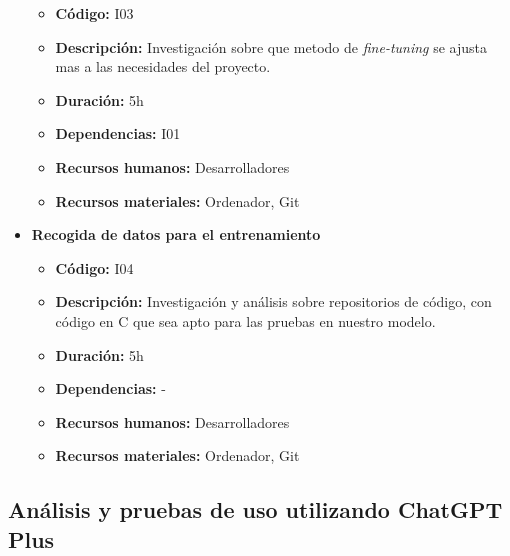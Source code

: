 \begin{itemize}
\begin{itemize}
            \item \textbf{Código:} I03
            \item \textbf{Descripción:} Investigación sobre que metodo de \textit{fine-tuning} se ajusta mas a las necesidades del proyecto.
            \item \textbf{Duración:} 5h
            \item \textbf{Dependencias:} I01
            \item \textbf{Recursos humanos:} Desarrolladores
            \item \textbf{Recursos materiales:} Ordenador, Git
        \end{itemize}
    \item \textbf{Recogida de datos para el entrenamiento}
        \begin{itemize}
            \item \textbf{Código:} I04
            \item \textbf{Descripción:} Investigación y análisis sobre repositorios de código, con código en C que sea apto para las pruebas en nuestro modelo. 
            \item \textbf{Duración:} 5h
            \item \textbf{Dependencias:} -
            \item \textbf{Recursos humanos:} Desarrolladores
            \item \textbf{Recursos materiales:} Ordenador, Git
        \end{itemize}
\end{itemize}

\subsection{Análisis y pruebas de uso utilizando ChatGPT Plus}
\label{subsec:tareas_ichatgpt}

